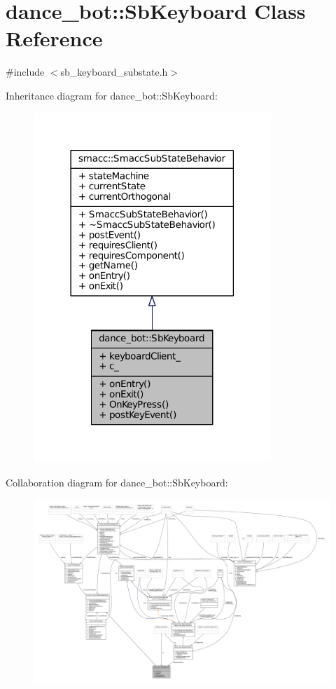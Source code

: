\hypertarget{classdance__bot_1_1SbKeyboard}{}\section{dance\+\_\+bot\+:\+:Sb\+Keyboard Class Reference}
\label{classdance__bot_1_1SbKeyboard}


{\ttfamily \#include $<$sb\+\_\+keyboard\+\_\+substate.\+h$>$}



Inheritance diagram for dance\+\_\+bot\+:\+:Sb\+Keyboard\+:
\nopagebreak
\begin{figure}[H]
\begin{center}
\leavevmode
\includegraphics[width=254pt]{classdance__bot_1_1SbKeyboard__inherit__graph}
\end{center}
\end{figure}


Collaboration diagram for dance\+\_\+bot\+:\+:Sb\+Keyboard\+:
\nopagebreak
\begin{figure}[H]
\begin{center}
\leavevmode
\includegraphics[width=350pt]{classdance__bot_1_1SbKeyboard__coll__graph}
\end{center}
\end{figure}
